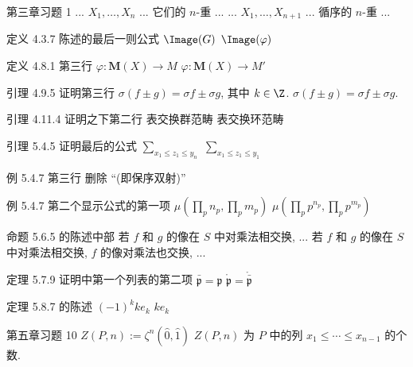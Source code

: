 \documentclass{AJerrata}
\begin{document}
\begin{Errata}
		\item[第三章习题 1]
		\Orig ... $X_1, \ldots, X_n$ ... 它们的 $n$-重 ...
		\Corr ... $X_1, \ldots, X_{n+1}$ ... 循序的 $n$-重 ...
		
		\item[定义 4.3.7 陈述的最后一则公式]
		\Orig $\Image(G)$
		\Corr $\Image(\varphi)$
		
		\item[定义 4.8.1 第三行]
		\Orig $\varphi: \mathbf{M}(X) \to M$
		\Corr $\varphi: \mathbf{M}(X) \to M'$
		
		\item[引理 4.9.5 证明第三行]
		\Orig $\sigma(f \pm g) = \sigma f \pm \sigma g$, 其中 $k \in \Z$.
		\Corr $\sigma(f \pm g) = \sigma f \pm \sigma g$.
		
		\item[引理 4.11.4 证明之下第二行]
		\Orig 表交换群范畴
		\Corr 表交换环范畴
		
		\item[引理 5.4.5 证明最后的公式]
		\Orig $\displaystyle\sum_{x_1 \leq z_1 \leq y_n}$
		\Corr $\displaystyle\sum_{x_1 \leq z_1 \leq y_1}$
		
		\item[例 5.4.7 第三行]
		删除 ``(即保序双射)''
		
		\item[例 5.4.7 第二个显示公式的第一项]
		\Orig $\mu\left( \prod_p n_p, \prod_p m_p \right)$
		\Corr $\mu\left( \prod_p p^{n_p}, \prod_p p^{m_p} \right)$
		
		\item[命题 5.6.5 的陈述中部]
		\Orig 若 $f$ 和 $g$ 的像在 $S$ 中对乘法相交换, ...
		\Corr 若 $f$ 和 $g$ 的像在 $S$ 中对乘法相交换, $f$ 的像对乘法也交换, ...
		
		\item[定理 5.7.9 证明中第一个列表的第二项]
		\Orig $\bar{\mathfrak{p}} = \mathfrak{p}$
		\Corr $\mathring{\mathfrak{p}} = \mathring{\bar{\mathfrak{p}}}$
		
		\item[定理 5.8.7 的陈述]
		\Orig $(-1)^k k e_k$
		\Corr $k e_k$
		
		\item[第五章习题 10]
		\Orig $Z(P, n) := \zeta^n(\hat{0}, \hat{1})$
		\Corr $Z(P, n)$ 为 $P$ 中的列 $x_1 \leq \cdots \leq x_{n-1}$ 的个数.
		

\end{Errata}
\end{document}
